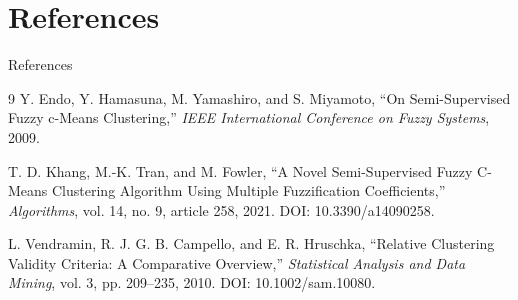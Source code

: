 \documentclass[t,aspectratio=169]{beamer}
\begin{document}
\section{References}
\useStyleLogoOnly

\begin{frame}{References}
  \small
  \begin{thebibliography}{9}
    Y. Endo, Y. Hamasuna, M. Yamashiro, and S. Miyamoto,
    ``On Semi-Supervised Fuzzy c-Means Clustering,''
    \emph{IEEE International Conference on Fuzzy Systems}, 2009.

    T. D. Khang, M.-K. Tran, and M. Fowler,
    ``A Novel Semi-Supervised Fuzzy C-Means Clustering Algorithm Using Multiple Fuzzification Coefficients,''
    \emph{Algorithms}, vol. 14, no. 9, article 258, 2021.
    DOI: 10.3390/a14090258.

    L. Vendramin, R. J. G. B. Campello, and E. R. Hruschka,
    ``Relative Clustering Validity Criteria: A Comparative Overview,''
    \emph{Statistical Analysis and Data Mining}, vol. 3, pp. 209--235, 2010.
    DOI: 10.1002/sam.10080.
  \end{thebibliography}
\end{frame}

\hidePageNumber
\hustthankyou
\end{document}

